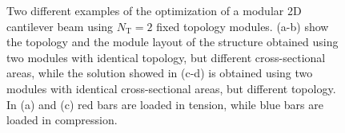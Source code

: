 \begin{figure}
    \hspace*{\fill}
    \hfill
    \hspace*{\fill}

    \bigskip

    \hspace*{\fill}
    \hfill
    \hspace*{\fill}
    \caption{Two different examples of the optimization of a modular 2D cantilever beam using $N_\text{T}=2$ fixed topology modules. (a-b) show the topology and the module layout of the structure obtained using two modules with identical topology, but different cross-sectional areas, while the solution showed in (c-d) is obtained using two modules with identical cross-sectional areas, but different topology. In (a) and (c) red bars are loaded in tension, while blue bars are loaded in compression.}
    \label{fig:06_multiple_fixed}
\end{figure}

